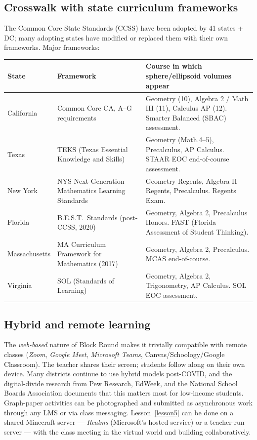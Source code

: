 \documentclass[12pt,a4paper]{scrartcl}
\begin{document}
\subsection{Crosswalk with state curriculum frameworks}

The Common Core State Standards (CCSS) have been adopted by 41 states + DC; many adopting states have modified or replaced them with their own frameworks. Major frameworks:

\begin{center}
\small
\begin{tabularx}{\textwidth}{@{}p{}p{}X@{}}
\toprule
\textbf{State} & \textbf{Framework} & \textbf{Course in which sphere/ellipsoid volumes appear} \\
\midrule
California & Common Core CA, A--G requirements & Geometry (10), Algebra 2 / Math III (11), Calculus AP (12). Smarter Balanced (SBAC) assessment. \\
\addlinespace[3pt]
Texas & TEKS (Texas Essential Knowledge and Skills) & Geometry (Math.4--5), Precalculus, AP Calculus. STAAR EOC end-of-course assessment. \\
\addlinespace[3pt]
New York & NYS Next Generation Mathematics Learning Standards & Geometry Regents, Algebra II Regents, Precalculus. Regents Exam. \\
\addlinespace[3pt]
Florida & B.E.S.T.\ Standards (post-CCSS, 2020) & Geometry, Algebra 2, Precalculus Honors. FAST (Florida Assessment of Student Thinking). \\
\addlinespace[3pt]
Massachusetts & MA Curriculum Framework for Mathematics (2017) & Geometry, Algebra 2, Precalculus. MCAS end-of-course. \\
\addlinespace[3pt]
Virginia & SOL (Standards of Learning) & Geometry, Algebra 2, Trigonometry, AP Calculus. SOL EOC assessment. \\
\bottomrule
\end{tabularx}
\end{center}

\subsection{Hybrid and remote learning}
The \emph{web-based} nature of Block Round makes it trivially compatible with remote classes (\emph{Zoom}, \emph{Google Meet}, \emph{Microsoft Teams}, Canvas/Schoology/Google Classroom). The teacher shares their screen; students follow along on their own device. Many districts continue to use hybrid models post-COVID, and the digital-divide research from Pew Research, EdWeek, and the National School Boards Association documents that this matters most for low-income students. Graph-paper activities can be photographed and submitted as asynchronous work through any LMS or via class messaging. Lesson~\ref{lesson5} can be done on a shared Minecraft server --- \emph{Realms} (Microsoft's hosted service) or a teacher-run server --- with the class meeting in the virtual world and building collaboratively.
\end{document}
